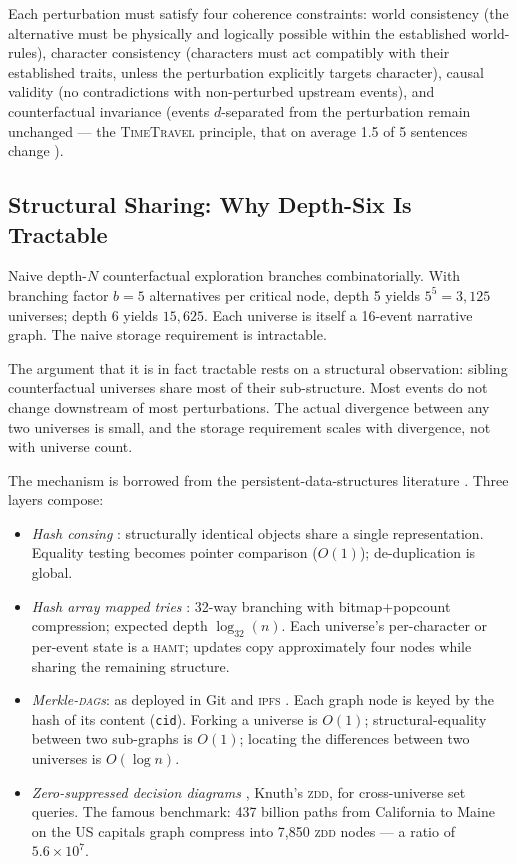 \documentclass[11pt]{article}
\theoremstyle{rukha}
\begin{document}
Each perturbation must satisfy four coherence constraints: world
consistency (the alternative must be physically and logically possible
within the established world-rules), character consistency (characters
must act compatibly with their established traits, unless the
perturbation explicitly targets character), causal validity (no
contradictions with non-perturbed upstream events), and
counterfactual invariance (events $d$-separated from the perturbation
remain unchanged --- the \textsc{TimeTravel} principle, that on average
1.5 of 5 sentences change \cite{timetravel}).

\subsection{Structural Sharing: Why Depth-Six Is Tractable}

Naive depth-$N$ counterfactual exploration branches combinatorially.
With branching factor $b = 5$ alternatives per critical node, depth 5
yields $5^5 = 3{,}125$ universes; depth 6 yields $15{,}625$. Each
universe is itself a 16-event narrative graph. The naive storage
requirement is intractable.

The argument that it is in fact tractable rests on a structural
observation: sibling counterfactual universes share most of their
sub-structure. Most events do not change downstream of most
perturbations. The actual divergence between any two universes is
small, and the storage requirement scales with divergence, not with
universe count.

The mechanism is borrowed from the persistent-data-structures literature
\cite{driscolltarjan, okasakipfds}. Three layers compose:

\begin{itemize}
  \item \emph{Hash consing} \cite{filliatreconchon}: structurally
    identical objects share a single representation. Equality testing
    becomes pointer comparison ($O(1)$); de-duplication is global.
  \item \emph{Hash array mapped tries} \cite{bagwellhamt}: 32-way
    branching with bitmap+popcount compression; expected depth
    $\log_{32}(n)$. Each universe's per-character or per-event state is
    a \textsc{hamt}; updates copy approximately four nodes while sharing
    the remaining structure.
  \item \emph{Merkle-\textsc{dag}s}: as deployed in Git and
    \textsc{ipfs} \cite{ipfsmerkledag}. Each graph node is keyed by the
    hash of its content (\texttt{cid}). Forking a universe is $O(1)$;
    structural-equality between two sub-graphs is $O(1)$; locating
    the differences between two universes is $O(\log n)$.
  \item \emph{Zero-suppressed decision diagrams} \cite{knuthzdd},
    Knuth's \textsc{zdd}, for cross-universe set queries. The famous
    benchmark: 437 billion paths from California to Maine on the US
    capitals graph compress into 7,850 \textsc{zdd} nodes --- a
    ratio of $5.6 \times 10^7$.
\end{itemize}
\end{document}
